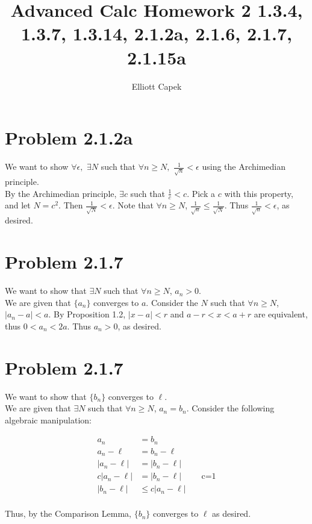 \documentclass[10pt]{article} %
\title{Advanced Calc Homework 2 \large 1.3.4, 1.3.7, 1.3.14, 2.1.2a, 2.1.6, 2.1.7, 2.1.15a}
\author{Elliott Capek}
\begin{document}
\maketitle{}

\section{Problem 2.1.2a}
We want to show $\forall \epsilon,$ $\exists N$ such that $\forall n \geq N,$ $\frac{1}{\sqrt{n}} < \epsilon$ using the Archimedian principle.\\

By the Archimedian principle, $\exists c$ such that $\frac{1}{c} < c$. Pick a $c$ with this property, and let $N = c^2$. Then $\frac{1}{\sqrt{N}} < \epsilon$. Note that $\forall n \geq N$, $\frac{1}{\sqrt{n}} \leq \frac{1}{\sqrt{N}}$. Thus $\frac{1}{\sqrt{n}} < \epsilon$, as desired.\\

\section{Problem 2.1.7}
We want to show that $\exists N$ such that $\forall n \geq N$, $a_n > 0$.\\

We are given that $\{a_n\}$ converges to $a$. Consider the $N$ such that $\forall n \geq N$, $\left|a_n - a\right| < a$. By Proposition 1.2, $\left|x - a\right| < r$ and $a-r < x < a+r$ are equivalent, thus $0 < a_n < 2a$. Thus $a_n > 0$, as desired.\\

\section{Problem 2.1.7}
We want to show that $\{b_n\}$ converges to $\ell$.\\

We are given that $\exists N$ such that $\forall n \geq N$, $a_n = b_n$. Consider the following algebraic manipulation:

\begin{align*}
  a_n &= b_n\\
  a_n - \ell &= b_n - \ell\\
  \left|a_n - \ell\right| &= \left|b_n - \ell\right|\\
  c\left|a_n - \ell\right| &= \left|b_n - \ell\right|\hspace{1cm}\mbox{c=1}\\
  \left|b_n - \ell\right| &\leq c\left|a_n - \ell\right|\\
\end{align*}

Thus, by the Comparison Lemma, $\{b_n\}$ converges to $\ell$ as desired.\\
\end{document}
